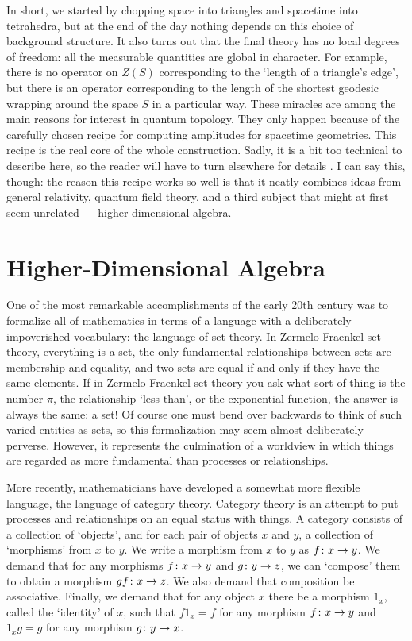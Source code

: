 \documentclass[12pt,amsfonts]{article}
\begin{document}
In short, we started by chopping space into triangles and spacetime into
tetrahedra, but at the end of the day nothing depends on this choice of
background structure.  It also turns out that the final theory has no
local degrees of freedom: all the measurable quantities are global in
character.   For example, there is no operator on $Z(S)$ corresponding
to the `length of a triangle's edge', but there is an operator
corresponding to the length of the shortest geodesic wrapping around the
space $S$ in a particular way.  These miracles are among the main
reasons for interest in quantum topology.  They only happen because of
the carefully chosen recipe for computing amplitudes for spacetime
geometries.   This recipe is the real core of the whole construction. 
Sadly, it is a bit too technical to describe here, so the reader will
have to turn elsewhere for details \cite{Kauffman,Turaev}.  I can say
this, though: the reason this recipe works so well is that it neatly
combines ideas from general relativity, quantum field theory, and a
third subject that might at first seem unrelated --- higher-dimensional
algebra.

\section{Higher-Dimensional Algebra} \label{HDA}

One of the most remarkable accomplishments of the early 20th century 
was to formalize all of mathematics in terms of a language with a
deliberately impoverished vocabulary: the language of set theory.  In
Zermelo-Fraenkel set theory, everything is a set, the only fundamental
relationships between sets are membership and equality, and two sets are
equal if and only if they have the same elements.  If in Zermelo-Fraenkel
set theory you ask what sort of thing is the number $\pi$, the
relationship `less than', or the exponential function, the answer is
always the same: a set!  Of course one must bend over backwards to think
of such varied entities as sets, so this formalization may seem almost
deliberately perverse.   However, it represents the culmination of a
worldview in which things are regarded as more fundamental than processes 
or relationships.

More recently, mathematicians have developed a somewhat more flexible
language, the language of category theory.  Category theory is an attempt
to put processes and relationships on an equal status with things.  A
category consists of a collection of `objects', and for each pair of
objects $x$ and $y$, a collection of `morphisms' from $x$ to $y$.  We
write a morphism from $x$ to $y$ as $f \colon x \rightarrow y$.   We demand
that for any morphisms $f \colon x \rightarrow y$ and $g \colon y \rightarrow z$, we can
`compose' them to obtain a morphism $gf \colon x \rightarrow z$.  We also demand
that composition be associative.  Finally, we demand that for any object
$x$ there be a morphism $1_x$, called the `identity' of $x$, such that 
$f1_x = f$ for any morphism $f \colon x \rightarrow y$ and $1_x g = g$ for any 
morphism $g \colon y \rightarrow x$. 
\end{document}

